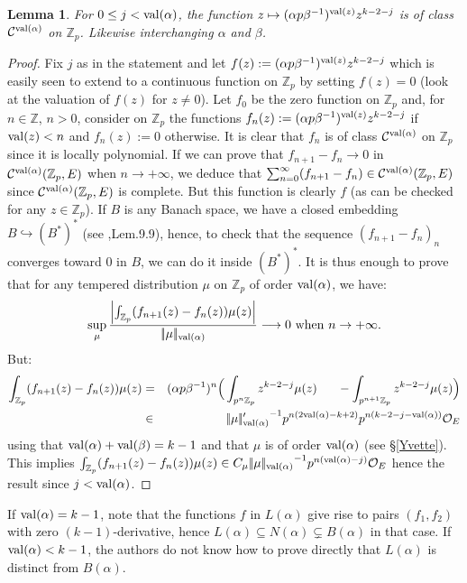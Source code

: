 \documentclass[11pt]{amsart}
\def\Z{{\mathbb Z}_p}
\def\O{{\mathcal O}_E}
\newtheorem{lem}[definit]{\bf{Lemma}}
\begin{document}
\begin{lem} 
For $0\leq j<{\rm val}(\alpha)$, the function $z\mapsto (\alpha
p\beta^{-1})^{{\rm val}(z)}z^{k-2-j}$ is of class ${\mathcal C}^{{\rm
    val}(\alpha)}$ on $\Z$. Likewise interchanging $\alpha$ and
$\beta$.  
\end{lem} 
\begin{proof} 
Fix $j$ as in the statement and let $f(z):=(\alpha p\beta^{-1})^{{\rm
    val}(z)}z^{k-2-j}$ which is easily seen to extend to a continuous
function on $\Z$ by setting $f(z)=0$ (look at the valuation of $f(z)$
for $z\ne 0$). Let $f_0$ be the zero function on $\Z$ and, for $n\in
{\mathbb Z}$, $n>0$, consider on $\Z$ the functions $f_n(z):=(\alpha
p\beta^{-1})^{{\rm val}(z)}z^{k-2-j}$ if ${\rm val}(z)<n$ and
$f_n(z):=0$ otherwise. It is clear that $f_n$ is of class ${\mathcal
  C}^{{\rm val}(\alpha)}$ on $\Z$ since it is locally polynomial. If
we can prove that $f_{n+1}-f_n\rightarrow 0$ in ${\mathcal C}^{{\rm
    val}(\alpha)}(\Z,E)$ when $n\rightarrow +\infty$, we deduce that
$\sum_{n=0}^{\infty}(f_{n+1}-f_n)\in {\mathcal C}^{{\rm
    val}(\alpha)}(\Z,E)$ since ${\mathcal C}^{{\rm
    val}(\alpha)}(\Z,E)$ is complete. But this function is clearly $f$
(as can be checked for any $z\in \Z$). If $B$ is any Banach space, we
have a closed embedding $B\hookrightarrow (B^*)^*$ (see
\cite{Schn},Lem.9.9), hence, to check that the sequence
$(f_{n+1}-f_n)_n$ converges toward $0$ in $B$, we can do it inside
$(B^*)^*$. It is thus enough to prove that for any tempered
distribution $\mu$ on $\Z$ of order ${\rm val}(\alpha)$, we have:  
$$\sup_{\mu}\frac{\left|\int_{\Z}(f_{n+1}(z)-f_n(z))\mu(z)\right|}{|\!|\mu|\!|_{{\rm
      val}(\alpha)}}\longrightarrow 0\ {\rm when}\ n\rightarrow
+\infty.$$  
But: 
\begin{eqnarray*} 
\int_{\Z}(f_{n+1}(z)-f_n(z))\mu(z)&=&(\alpha p\beta^{-1})^n
\Big(\int_{p^n\Z}z^{k-2-j}\mu(z) 
\ \ \ \ \ -\int_{p^{n+1}\Z}z^{k-2-j}\mu(z)\Big)\\  
&\in &{|\!|\mu|\!|'_{{\rm val}(\alpha)}}^{-1}p^{n(2{\rm
    val}(\alpha)-k+2)}p^{n(k-2-j-{\rm val}(\alpha))}\O  
\end{eqnarray*} 
using that ${\rm val}(\alpha)+{\rm val}(\beta)=k-1$ and that $\mu$ is
of order ${\rm val}(\alpha)$ (see \S\ref{Yvette}). This implies
$\int_{\Z}(f_{n+1}(z)-f_n(z))\mu(z)\in C_{\mu}{|\!|\mu|\!|_{{\rm
    val}(\alpha)}}^{-1}p^{n({\rm val}(\alpha)-j)}\O$ hence the result since
$j<{\rm val}(\alpha)$.  
\end{proof} 
 
If ${\rm val}(\alpha)=k-1$, note that the functions $f$ in
$L(\alpha)$ give rise to pairs $(f_1,f_2)$ with zero $(k-1)$-derivative, hence $L(\alpha)\subseteq N(\alpha)\subsetneq B(\alpha)$ in that case. If ${\rm
  val}(\alpha)<k-1$, the authors do not know how to
prove directly that $L(\alpha)$ is distinct from $B(\alpha)$.  
\end{document}
